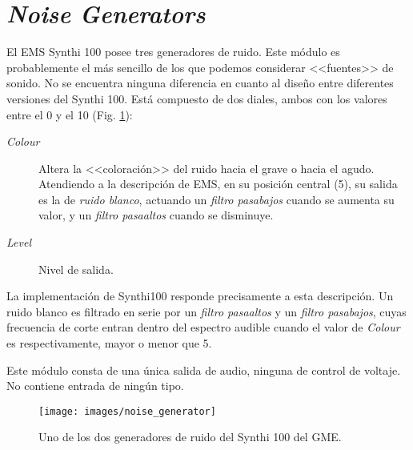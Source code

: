 \section{\textit{Noise Generators}}

El EMS Synthi 100 posee tres generadores de ruido. Este módulo es probablemente el más sencillo de los que podemos considerar <<fuentes>> de sonido. No se encuentra ninguna diferencia en cuanto al diseño entre diferentes versiones del Synthi 100. Está compuesto de dos diales, ambos con los valores entre el 0 y el 10 (Fig. \ref{fig:noise_generator}):

\begin{description}
	\item[\textit{Colour}] Altera la <<coloración>> del ruido hacia el grave o hacia el agudo. Atendiendo a la descripción de EMS, en su posición central (5), su salida es la de \textit{ruido blanco}, actuando un \textit{filtro pasabajos} cuando se aumenta su valor, y un \textit{filtro pasaaltos} cuando se disminuye.
	\item[\textit{Level}] Nivel de salida.
\end{description}

La implementación de Synthi100 responde precisamente a esta descripción. Un ruido blanco es filtrado en serie por un \textit{filtro pasaaltos} y un \textit{filtro pasabajos}, cuyas frecuencia de corte entran dentro del espectro audible cuando el valor de \textit{Colour} es respectivamente, mayor o menor que 5.

Este módulo consta de una única salida de audio, ninguna de control de voltaje. No contiene entrada de ningún tipo.

\begin{figure}
	\centering
	\texttt{[image: images/noise\_generator]}
	\caption{Uno de los dos generadores de ruido del Synthi 100 del GME.}
	\label{fig:noise_generator}
\end{figure}